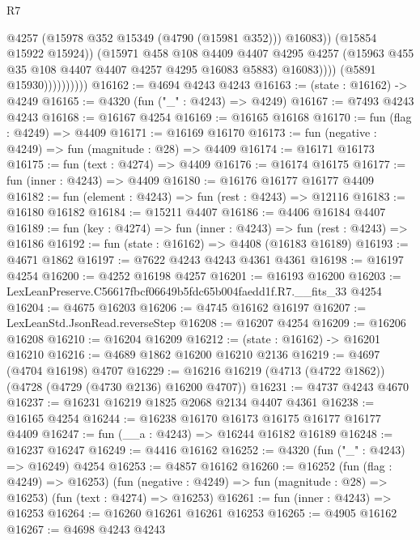 \begin{lexlean}{R7}
\begin{coremodule}
                                  @4257
                                  (@15978 @352 @15349 (@4790 (@15981 @352)))
                                  @16083))
                              (@15854 @15922 @15924))
                            (@15971
                              @458
                              @108
                              @4409
                              @4407
                              @4295
                              @4257
                              (@15963 @455 @35 @108 @4407 @4407 @4257 @4295 @16083 @5883)
                              @16083))))
                      (@5891 @15930))))))))))
@16162 := @4694 @4243 @4243
@16163 := (state : @16162) -> @4249
@16165 := @4320 (fun ("_" : @4243) => @4249)
@16167 := @7493 @4243 @4243
@16168 := @16167 @4254
@16169 := @16165 @16168
@16170 := fun (flag : @4249) => @4409
@16171 := @16169 @16170
@16173 := fun (negative : @4249) => fun (magnitude : @28) => @4409
@16174 := @16171 @16173
@16175 := fun (text : @4274) => @4409
@16176 := @16174 @16175
@16177 := fun (inner : @4243) => @4409
@16180 := @16176 @16177 @16177 @4409
@16182 := fun (element : @4243) => fun (rest : @4243) => @12116
@16183 := @16180 @16182
@16184 := @15211 @4407
@16186 := @4406 @16184 @4407
@16189 := fun (key : @4274) => fun (inner : @4243) => fun (rest : @4243) => @16186
@16192 := fun (state : @16162) => @4408 (@16183 @16189)
@16193 := @4671 @1862
@16197 := @7622 @4243 @4243 @4361 @4361
@16198 := @16197 @4254
@16200 := @4252 @16198 @4257
@16201 := @16193 @16200
@16203 := LexLeanPreserve.C56617fbcf06649b5fdc65b004faedd1f.R7.__fits_33 @4254
@16204 := @4675 @16203
@16206 := @4745 @16162 @16197
@16207 := LexLeanStd.JsonRead.reverseStep
@16208 := @16207 @4254
@16209 := @16206 @16208
@16210 := @16204 @16209
@16212 := (state : @16162) -> @16201 @16210
@16216 := @4689 @1862 @16200 @16210 @2136
@16219 := @4697 (@4704 @16198) @4707
@16229 := @16216 @16219 (@4713 (@4722 @1862)) (@4728 (@4729 (@4730 @2136) @16200 @4707))
@16231 := @4737 @4243 @4670
@16237 := @16231 @16219 @1825 @2068 @2134 @4407 @4361
@16238 := @16165 @4254
@16244 := @16238 @16170 @16173 @16175 @16177 @16177 @4409
@16247 := fun (__a : @4243) => @16244 @16182 @16189
@16248 := @16237 @16247
@16249 := @4416 @16162
@16252 := @4320 (fun ("_" : @4243) => @16249) @4254
@16253 := @4857 @16162
@16260 := @16252
    (fun (flag : @4249) => @16253)
    (fun (negative : @4249) => fun (magnitude : @28) => @16253)
    (fun (text : @4274) => @16253)
@16261 := fun (inner : @4243) => @16253
@16264 := @16260 @16261 @16261 @16253
@16265 := @4905 @16162
@16267 := @4698 @4243 @4243

\end{coremodule}
\end{lexlean}
